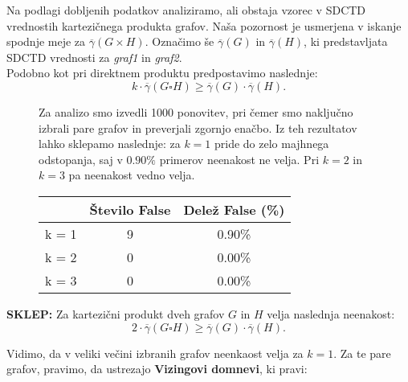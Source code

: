 \documentclass[a4paper, 12pt]{article}
\begin{document}
\noindent Na podlagi dobljenih podatkov analiziramo, ali obstaja vzorec v SDCTD vrednostih kartezičnega produkta grafov. Naša pozornost je usmerjena v iskanje spodnje meje za \(\overline{\gamma}(G \times H)\). Označimo še \(\overline{\gamma}(G)\) in \(\overline{\gamma}(H)\), ki predstavljata SDCTD vrednosti za \textit{graf1} in \textit{graf2}. \\

\noindent Podobno kot pri direktnem produktu predpostavimo naslednje: 
\[
k \cdot \overline{\gamma}(G \square H) \geq \overline{\gamma}(G) \cdot \overline{\gamma}(H).
\]


\begin{figure}[h!]
    \centering
    \begin{minipage}{0.45\textwidth}
        Za analizo smo izvedli 1000 ponovitev, pri čemer smo naključno izbrali pare grafov in preverjali zgornjo enačbo. Iz teh rezultatov lahko sklepamo naslednje: za \(k = 1\) pride do zelo majhnega odstopanja, saj v \(0.90\%\) primerov neenakost ne velja. Pri \(k = 2\) in \(k = 3\) pa neenakost vedno velja. 
    \end{minipage}%
    \hfill
    \begin{minipage}{0.45\textwidth}
        \centering
        \begin{tabular}{@{}lcc@{}}
        \toprule
        \textbf{} & \textbf{Število False} & \textbf{Delež False (\%)} \\ \midrule
        k = 1         & 9                      & 0.90\%                   \\
        k = 2         & 0                      & 0.00\%                   \\
        k = 3         & 0                      & 0.00\%                   \\ \bottomrule
        \end{tabular}

        \label{tab:rezultati}
    \end{minipage}
\end{figure}



\noindent \textbf{SKLEP:} Za kartezični produkt dveh grafov \(G\) in \(H\) velja naslednja neenakost:
\[
2 \cdot \overline{\gamma}(G \square H) \geq \overline{\gamma}(G) \cdot \overline{\gamma}(H).
\]

\vspace{6pt}


\noindent Vidimo, da v veliki večini izbranih grafov neenkaost velja za $k = 1$. Za te pare grafov, pravimo, da ustrezajo \textbf{Vizingovi domnevi}, ki pravi:  
\end{document}

